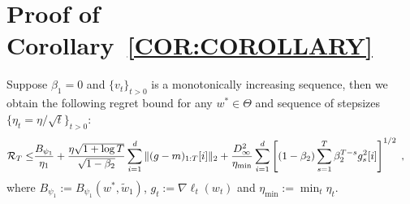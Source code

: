 \documentclass[wcp]{jmlr}
\begin{document}
\vspace{0.2in}

\section{Proof of Corollary~\ref{COR:COROLLARY}}
\begin{Corollary*}
Suppose $\beta_1=0$ and $\{v_t\}_{t>0}$ is a monotonically increasing sequence, then we obtain the following regret bound for any $w^{*} \in \Theta$ and sequence of stepsizes $\{ \eta_t = \eta/\sqrt{t}\}_{t>0}$: 
\begin{equation}\notag
\begin{aligned}
\mathcal{R}_T \leq & \frac{ B_{\psi_1}}{\eta_1}
+ \frac{\eta \sqrt{1 + \log T}}{\sqrt{1 - \beta_2}} \sum_{i=1}^d \| (g-m)_{1:T}[i] \|_2 +\frac{D_{\infty}^2}{\eta_{\min}} \sum_{i=1}^d \left[ (1-\beta_2) \sum_{s=1}^{T} \beta_2^{T-s} g^2_s[i] \right]^{1/2} \eqsp,
\end{aligned}
\end{equation}
where $B_{\psi_1} := B_{\psi_1}(w^*, \tilde{w}_{1})$, $g_{t}:= \nabla \ell_{t}(w_t)$ and $\eta_{{\min}} := \min_{{t}} \eta_{t}$.
\end{Corollary*}
\end{document}
